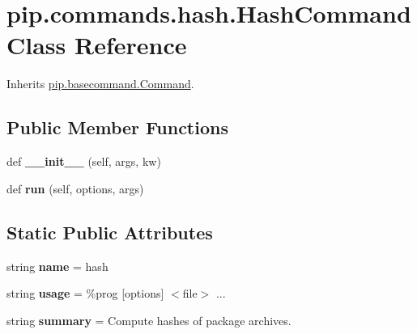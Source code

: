 \hypertarget{classpip_1_1commands_1_1hash_1_1_hash_command}{}\section{pip.\+commands.\+hash.\+Hash\+Command Class Reference}
\label{classpip_1_1commands_1_1hash_1_1_hash_command}


Inherits \hyperlink{classpip_1_1basecommand_1_1_command}{pip.\+basecommand.\+Command}.

\subsection*{Public Member Functions}
\begin{DoxyCompactItemize}
\item 
\mbox{\label{classpip_1_1commands_1_1hash_1_1_hash_command_a38252344e973f6ef2ae40aff72475120}} 
def {\bfseries \+\_\+\+\_\+init\+\_\+\+\_\+} (self, args, kw)
\item 
\mbox{\label{classpip_1_1commands_1_1hash_1_1_hash_command_a4e2ea14582dfd33528c2968856b17211}} 
def {\bfseries run} (self, options, args)
\end{DoxyCompactItemize}
\subsection*{Static Public Attributes}
\begin{DoxyCompactItemize}
\item 
\mbox{\label{classpip_1_1commands_1_1hash_1_1_hash_command_a621bc0652d36cf1b400a3625a926d519}} 
string {\bfseries name} = \textquotesingle{}hash\textquotesingle{}
\item 
\mbox{\label{classpip_1_1commands_1_1hash_1_1_hash_command_a54c8608e5b6e0d7b9d8fbe5794bcf0ab}} 
string {\bfseries usage} = \textquotesingle{}\%prog \mbox{[}options\mbox{]} $<$file$>$ ...\textquotesingle{}
\item 
\mbox{\label{classpip_1_1commands_1_1hash_1_1_hash_command_afd4a9656a8fb8bd01977167e6484829f}} 
string {\bfseries summary} = \textquotesingle{}Compute hashes of package archives.\textquotesingle{}
\end{DoxyCompactItemize}
